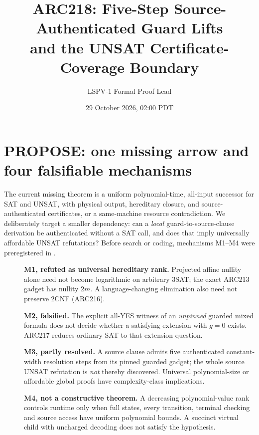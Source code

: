 \documentclass[11pt]{article}
\title{ARC218: Five-Step Source-Authenticated Guard Lifts\\and the UNSAT Certificate-Coverage Boundary}
\author{LSPV-1 Formal Proof Lead}
\date{29 October 2026, 02:00 PDT}
\begin{document}
\maketitle
\begin{center}
\end{center}

\section{PROPOSE: one missing arrow and four falsifiable mechanisms}
The current missing theorem is a uniform polynomial-time, all-input successor for SAT and UNSAT, with physical output, hereditary closure, and source-authenticated certificates, or a same-machine resource contradiction. We deliberately target a smaller dependency: can a \emph{local} guard-to-source-clause derivation be authenticated without a SAT call, and does that imply universally affordable UNSAT refutations? Before search or coding, mechanisms M1--M4 were preregistered in .
\begin{description}
\item[]\textbf{M1, refuted as universal hereditary rank.} Projected affine nullity alone need not become logarithmic on arbitrary 3SAT; the exact ARC213 gadget has nullity $2m$. A language-changing elimination also need not preserve 2CNF (ARC216).
\item[]\textbf{M2, falsified.} The explicit all-YES witness of an \emph{unpinned} guarded mixed formula does not decide whether a satisfying extension with $g=0$ exists. ARC217 reduces ordinary SAT to that extension question.
\item[]\textbf{M3, partly resolved.} A source clause admits five authenticated constant-width resolution steps from its pinned guarded gadget; the whole source UNSAT refutation is \emph{not} thereby discovered. Universal polynomial-size or affordable global proofs have complexity-class implications.
\item[]\textbf{M4, not a constructive theorem.} A decreasing polynomial-value rank controls runtime only when full states, every transition, terminal checking and source access have uniform polynomial bounds. A succinct virtual child with uncharged decoding does not satisfy the hypothesis.
\end{description}
\end{document}
